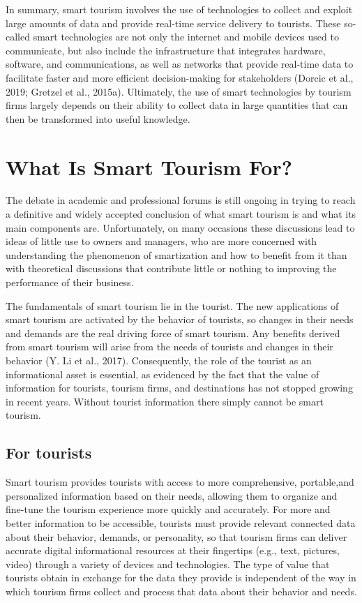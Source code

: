 \documentclass[
  letterpaper,
  DIV=11,
  numbers=noendperiod]{scrreprt}
\begin{document}
In summary, smart tourism involves the use of technologies to collect
and exploit large amounts of data and provide real-time service delivery
to tourists. These so-called smart technologies are not only the
internet and mobile devices used to communicate, but also include the
infrastructure that integrates hardware, software, and communications,
as well as networks that provide real-time data to facilitate faster and
more efficient decision-making for stakeholders (Dorcic et al., 2019;
Gretzel et al., 2015a). Ultimately, the use of smart technologies by
tourism firms largely depends on their ability to collect data in large
quantities that can then be transformed into useful knowledge.

\hypertarget{what-is-smart-tourism-for}{%
\section{What Is Smart Tourism For?}\label{what-is-smart-tourism-for}}

The debate in academic and professional forums is still ongoing in
trying to reach a definitive and widely accepted conclusion of what
smart tourism is and what its main components are. Unfortunately, on
many occasions these discussions lead to ideas of little use to owners
and managers, who are more concerned with understanding the phenomenon
of smartization and how to benefit from it than with theoretical
discussions that contribute little or nothing to improving the
performance of their business.

The fundamentals of smart tourism lie in the tourist. The new
applications of smart tourism are activated by the behavior of tourists,
so changes in their needs and demands are the real driving force of
smart tourism. Any benefits derived from smart tourism will arise from
the needs of tourists and changes in their behavior (Y. Li et al.,
2017). Consequently, the role of the tourist as an informational asset
is essential, as evidenced by the fact that the value of information for
tourists, tourism firms, and destinations has not stopped growing in
recent years. Without tourist information there simply cannot be smart
tourism.

\hypertarget{for-tourists}{%
\subsection{For tourists}\label{for-tourists}}

Smart tourism provides tourists with access to more comprehensive,
portable,and personalized information based on their needs, allowing
them to organize and fine-tune the tourism experience more quickly and
accurately. For more and better information to be accessible, tourists
must provide relevant connected data about their behavior, demands, or
personality, so that tourism firms can deliver accurate digital
informational resources at their fingertips (e.g., text, pictures,
video) through a variety of devices and technologies. The type of value
that tourists obtain in exchange for the data they provide is
independent of the way in which tourism firms collect and process that
data about their behavior and needs.
\end{document}

